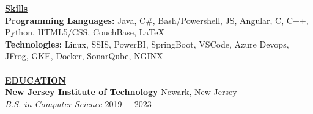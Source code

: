 \documentclass{article}
\begin{document}
\noindent \textbf{\underline{Skills}} \\
\noindent \textbf{Programming Languages: } Java, C\#, Bash/Powershell, JS, Angular, C, C++, Python, HTML5/CSS, CouchBase, \LaTeX\\
\noindent \textbf{Technologies: } Linux, SSIS, PowerBI, SpringBoot, VSCode, Azure Devops, JFrog, GKE, Docker, SonarQube, NGINX\\ \\
\noindent \textbf{\underline{EDUCATION}} \\
\textbf{New Jersey Institute of Technology} \hfill Newark, New Jersey \\
\textit{B.S. in Computer Science}  \hfill \hfill 2019 $-$ 2023 \\
\end{document}
